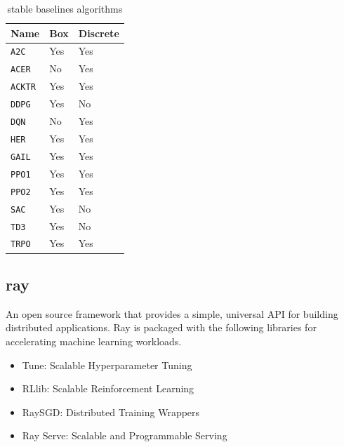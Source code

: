 \begin{table}[htbp]
\centering
\begin{tabular}{l l l} \toprule
\bfseries Name       & \bfseries Box  & \bfseries Discrete \\ \midrule
\verb#A2C#                         & Yes  &  Yes \\
\verb#ACER#                  			 & No   &  Yes \\
\verb#ACKTR#                       & Yes  &  Yes \\
\verb#DDPG#                        & Yes  &  No  \\
\verb#DQN#                         & No   &  Yes \\
\verb#HER#                         & Yes  &  Yes \\
\verb#GAIL#                        & Yes  &  Yes \\
\verb#PPO1#                        & Yes  &  Yes \\
\verb#PPO2#                        & Yes  &  Yes \\
\verb#SAC#                         & Yes  &  No  \\
\verb#TD3#                         & Yes  &  No  \\
\verb#TRPO#                        & Yes  &  Yes \\
\bottomrule
\end{tabular}
\caption{stable baselines algorithms}
\label{tab:stable-baselines}
\end{table}

\subsection{\gls{ray}}
An open source framework that provides a simple, universal API for building distributed applications. Ray is packaged with the following libraries for accelerating machine learning workloads\parencite{DBLP:journals/corr/abs-1712-05889}.
\begin{itemize}
	\item Tune: Scalable Hyperparameter Tuning
	\item RLlib: Scalable Reinforcement Learning
	\item RaySGD: Distributed Training Wrappers
	\item Ray Serve: Scalable and Programmable Serving
\end{itemize}



